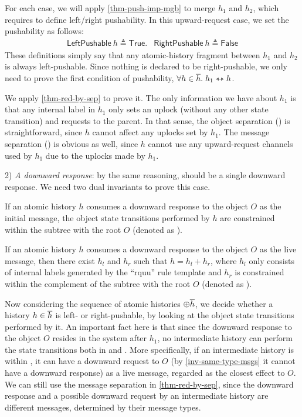 For each case, we will apply \autoref{thm-push-imp-mgb} to merge $h_1$ and $h_2$, which requires to define left/right pushability.
In this upward-request case, we set the pushability as follows:
\begin{displaymath}
  \renewcommand{\arraystretch}{1.2}
  \begin{array}{lr}
    \mathsf{LeftPushable}\ h \triangleq \mathsf{True}. &
    \mathsf{RightPushable}\ h \triangleq \mathsf{False}
  \end{array}
\end{displaymath}
These definitions simply say that any atomic-history fragment between $h_1$ and $h_2$ is always left-pushable.
Since nothing is declared to be right-pushable, we only need to prove the first condition of pushability, \ie{} $\forall h \in \overline{h}.\; h_1 \leftrightarrowtriangle h$.

We apply \autoref{thm-red-by-sep} to prove it.
The only information we have about $h_1$ is that any internal label in $h_1$ only sets an uplock (without any other state transition) and requests to the parent.
In that sense, the object separation () is straightforward, since $h$ cannot affect any uplocks set by $h_1$.
The message separation () is obvious as well, since $h$ cannot use any upward-request channels used by $h_1$ due to the uplocks made by $h_1$.

2) \emph{A downward response}: by the same reasoning,  should be a single downward response.
We need two dual invariants to prove this case.
\begin{invariant}\label{inv-downward-rs-init}
  If an atomic history $h$ consumes a downward response to the object $O$ as the initial message, the object state transitions performed by $h$ are constrained within the subtree with the root $O$ (denoted as ).
\end{invariant}
\begin{invariant}\label{inv-downward-rs-live}
  If an atomic history $h$ consumes a downward response to the object $O$ as the live message, then there exist $h_l$ and $h_r$ such that $h = h_l + h_r$, where $h_l$ only consists of internal labels generated by the ``rquu'' rule template and $h_r$ is constrained within the complement of the subtree with the root $O$ (denoted as ).
\end{invariant}

Now considering the sequence of atomic histories $\oplus \overline{h}$, we decide whether a history $h \in \overline{h}$ is left- or right-pushable, by looking at the object state transitions performed by it.
An important fact here is that since the downward response to the object $O$ resides in the system after $h_1$, no intermediate history can perform the state transitions both in  and .
More specifically, if an intermediate history is within , it can have a downward request to $O$ (by \autoref{inv-same-type-msgs} it cannot have a downward response) as a live message, regarded as the closest effect to $O$.
We can still use the message separation in \autoref{thm-red-by-sep}, since the downward response and a possible downward request by an intermediate history are different messages, determined by their message types.

